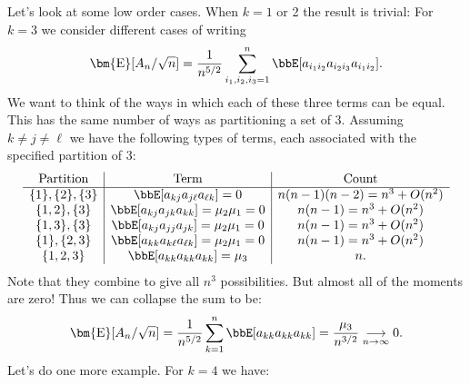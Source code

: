 Let's look at some low order cases. When $k = 1$ or 2 the result is trivial:
For $k = 3$ we consider different cases of writing
\[
\ensuremath{\bm{\mathrm{E}}}[A_n/\sqrt{n}] = {1 \over n^{5/2}} \ensuremath{\sum}_{i_1,i_2,i_3=1}^n \ensuremath{\bbE}[a_{i_1i_2}a_{i_2i_3}a_{i_1i_2}].
\]
We want to think of the ways in which each of these three terms can be equal. This has  the same number of ways as partitioning a set of 3. Assuming $k \ensuremath{\neq} j \ensuremath{\neq} \ensuremath{\ell}$ we have the following types of terms, each associated with the specified partition of 3:
\[
\begin{array}{c | c | c}
\hbox{Partition} & \hbox{Term} & \hbox{Count} \\
\hline
  \{1\}, \{2\}, \{3\}  & \ensuremath{\bbE}[a_{kj} a_{j\ensuremath{\ell}} a_{\ensuremath{\ell}k}] = 0   &  n (n-1)(n-2) = n^3 + O(n^2) \\
  \{1,2\}, \{3\}  & \ensuremath{\bbE}[a_{kj} a_{jk} a_{kk}] = \ensuremath{\mu}_2 \ensuremath{\mu}_1 = 0  &  n (n-1)= n^3 + O(n^2) \\
  \{1,3\}, \{3\}  & \ensuremath{\bbE}[a_{kj} a_{jj} a_{jk}] = \ensuremath{\mu}_2 \ensuremath{\mu}_1 = 0 &  n (n-1)= n^3 + O(n^2)  \\
  \{1\},  \{2,3\}  & \ensuremath{\bbE}[a_{kk} a_{k\ensuremath{\ell}} a_{\ensuremath{\ell}k}] = \ensuremath{\mu}_2 \ensuremath{\mu}_1 = 0 &  n (n-1)= n^3 + O(n^2)  \\
 \{1,2,3\} & \ensuremath{\bbE}[a_{kk} a_{kk} a_{kk}] = \ensuremath{\mu}_3&  n.
\end{array}
\]
Note that they combine to give all $n^3$ possibilities. But almost all of the moments are zero! Thus we can collapse the sum to be:
\[
\ensuremath{\bm{\mathrm{E}}}[A_n/\sqrt{n}] = {1 \over n^{5/2}} \ensuremath{\sum}_{k=1}^n \ensuremath{\bbE}[a_{kk} a_{kk} a_{kk}] = {\ensuremath{\mu}_3 \over n^{3/2}}  \underset{n \ensuremath{\rightarrow} \ensuremath{\infty}}{\ensuremath{\longrightarrow}}  0.
\]
Let's do one more example. For $k = 4$ we have:
